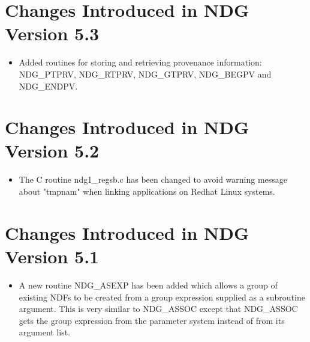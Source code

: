 
\newpage
\section{Changes Introduced in NDG Version 5.3}
\begin{itemize}
   \item Added routines for storing and retrieving provenance information:
         NDG\_PTPRV, NDG\_RTPRV, NDG\_GTPRV, NDG\_BEGPV and NDG\_ENDPV.
\end{itemize}

\section{Changes Introduced in NDG Version 5.2}
\begin{itemize}
   \item The C routine ndg1\_regsb.c has been changed to avoid warning 
         message about "tmpnam" when linking applications on Redhat Linux 
	 systems.
\end{itemize}

\section{Changes Introduced in NDG Version 5.1}
\begin{itemize}
   \item A new routine NDG\_ASEXP has been added which allows a group of
         existing NDFs to be created from a group expression supplied as 
         a subroutine argument. This is very similar to NDG\_ASSOC except
         that NDG\_ASSOC gets the group expression from the parameter system
         instead of from its argument list.
\end{itemize}


